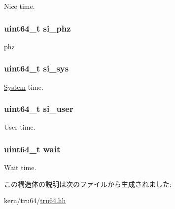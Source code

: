 Nice time. \hypertarget{structTru64_1_1tbl__sysinfo_a0d64d5cfd0905608018f7a103fb6db89}{
\subsubsection[{si\_\-phz}]{\setlength{\rightskip}{0pt plus 5cm}uint64\_\-t {\bf si\_\-phz}}}
\label{structTru64_1_1tbl__sysinfo_a0d64d5cfd0905608018f7a103fb6db89}


phz \hypertarget{structTru64_1_1tbl__sysinfo_a379c36837524ffda4336d4ec44dfed65}{
\subsubsection[{si\_\-sys}]{\setlength{\rightskip}{0pt plus 5cm}uint64\_\-t {\bf si\_\-sys}}}
\label{structTru64_1_1tbl__sysinfo_a379c36837524ffda4336d4ec44dfed65}


\hyperlink{classSystem}{System} time. \hypertarget{structTru64_1_1tbl__sysinfo_ad4a5a7ae9451778b6c8bbdc01e9453c7}{
\subsubsection[{si\_\-user}]{\setlength{\rightskip}{0pt plus 5cm}uint64\_\-t {\bf si\_\-user}}}
\label{structTru64_1_1tbl__sysinfo_ad4a5a7ae9451778b6c8bbdc01e9453c7}


User time. \hypertarget{structTru64_1_1tbl__sysinfo_a26c8b9811207ae95ab63ce8c4f8b88b6}{
\subsubsection[{wait}]{\setlength{\rightskip}{0pt plus 5cm}uint64\_\-t {\bf wait}}}
\label{structTru64_1_1tbl__sysinfo_a26c8b9811207ae95ab63ce8c4f8b88b6}


Wait time. 

この構造体の説明は次のファイルから生成されました:\begin{DoxyCompactItemize}
\item 
kern/tru64/\hyperlink{kern_2tru64_2tru64_8hh}{tru64.hh}\end{DoxyCompactItemize}
